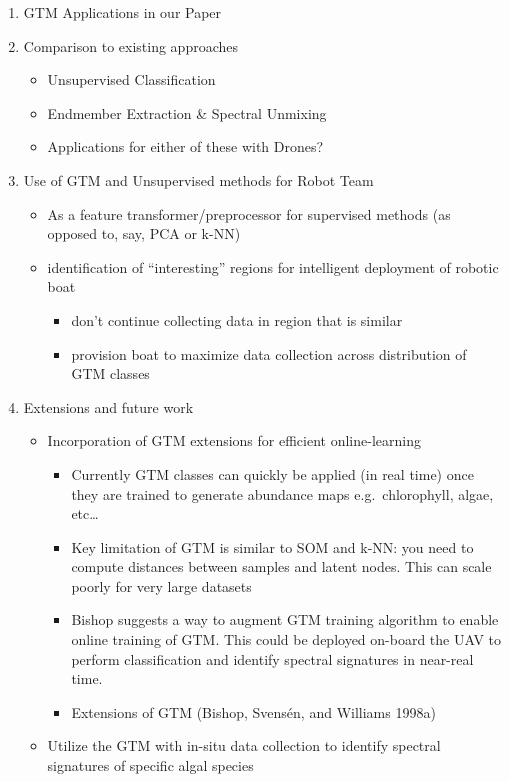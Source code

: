\documentclass[
  letterpaper,
  DIV=11,
  numbers=noendperiod]{scrartcl}
\providecommand{\tightlist}{%
  \setlength{\itemsep}{0pt}\setlength{\parskip}{0pt}}\usepackage{longtable,booktabs,array}
\begin{document}
\begin{enumerate}
\def\labelenumi{\arabic{enumi}.}
\tightlist
\item
  GTM Applications in our Paper
\item
  Comparison to existing approaches

  \begin{itemize}
  \tightlist
  \item
    Unsupervised Classification
  \item
    Endmember Extraction \& Spectral Unmixing
  \item
    Applications for either of these with Drones?
  \end{itemize}
\item
  Use of GTM and Unsupervised methods for Robot Team

  \begin{itemize}
  \tightlist
  \item
    As a feature transformer/preprocessor for supervised methods (as
    opposed to, say, PCA or k-NN)
  \item
    identification of ``interesting'' regions for intelligent deployment
    of robotic boat

    \begin{itemize}
    \tightlist
    \item
      don't continue collecting data in region that is similar
    \item
      provision boat to maximize data collection across distribution of
      GTM classes
    \end{itemize}
  \end{itemize}
\item
  Extensions and future work

  \begin{itemize}
  \tightlist
  \item
    Incorporation of GTM extensions for efficient online-learning

    \begin{itemize}
    \tightlist
    \item
      Currently GTM classes can quickly be applied (in real time) once
      they are trained to generate abundance maps e.g.~chlorophyll,
      algae, etc\ldots{}
    \item
      Key limitation of GTM is similar to SOM and k-NN: you need to
      compute distances between samples and latent nodes. This can scale
      poorly for very large datasets
    \item
      Bishop suggests a way to augment GTM training algorithm to enable
      online training of GTM. This could be deployed on-board the UAV to
      perform classification and identify spectral signatures in
      near-real time.
    \item
      Extensions of GTM (Bishop, Svensén, and Williams 1998a)
    \end{itemize}
  \item
    Utilize the GTM with in-situ data collection to identify spectral
    signatures of specific algal species
  \end{itemize}
\end{enumerate}
\end{document}
